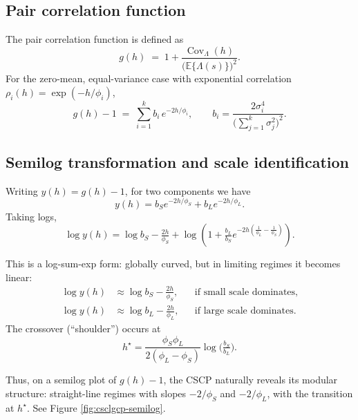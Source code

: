\documentclass[11pt]{article}
\begin{document}
\subsection{Pair correlation function}
The pair correlation function is defined as
\[
g(h) \;=\; 1 + \frac{\operatorname{Cov}_\Lambda(h)}{ \big(\mathbb{E}\{\Lambda(s)\}\big)^2 }.
\]
For the zero-mean, equal-variance case with exponential correlation $\rho_i(h) = \exp(-h/\phi_i)$, 
\[
g(h)-1 \;=\; \sum_{i=1}^k b_i \, e^{-2h/\phi_i},
\qquad 
b_i = \frac{2\sigma_i^4}{\Big(\sum_{j=1}^k \sigma_j^2\Big)^2}.
\]

\subsection{Semilog transformation and scale identification}
Writing $y(h)=g(h)-1$, for two components we have
\[
y(h) = b_S e^{-2h/\phi_S} + b_L e^{-2h/\phi_L}.
\]
Taking logs,
\[
\log y(h) = \log b_S - \tfrac{2h}{\phi_S} 
+ \log\!\left(1 + \tfrac{b_L}{b_S} e^{-2h\left(\tfrac{1}{\phi_L}-\tfrac{1}{\phi_S}\right)}\right).
\]

This is a log-sum-exp form: globally curved, but in limiting regimes it becomes linear:
\begin{align*}
	\log y(h) &\approx \log b_S - \tfrac{2h}{\phi_S}, && \text{if small scale dominates},\\
	\log y(h) &\approx \log b_L - \tfrac{2h}{\phi_L}, && \text{if large scale dominates}.
\end{align*}
The crossover (“shoulder”) occurs at 
\[
h^\star = \frac{\phi_S \phi_L}{2(\phi_L - \phi_S)} 
\log\!\Big(\tfrac{b_S}{b_L}\Big).
\]

Thus, on a semilog plot of $g(h)-1$, the CSCP naturally reveals its modular structure: 
straight-line regimes with slopes $-2/\phi_S$ and $-2/\phi_L$, with the transition at $h^\star$. See Figure \ref{fig:csclgcp-semilog}.
\end{document}
